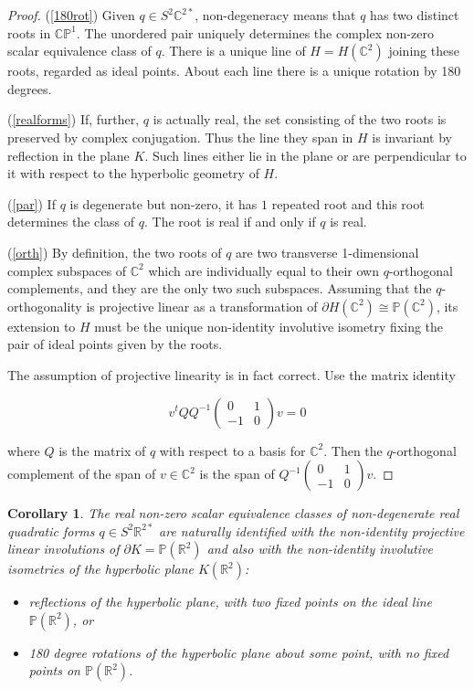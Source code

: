 \documentclass[11pt]{article}
\numberwithin{equation}{section}
\newcounter{count}
\theoremstyle{plain}
\newtheorem{corollary}[count]{Corollary}
\theoremstyle{remark}
\renewcommand{\P}{\mathbb{P}}
\newcommand{\R}{\mathbb{R}}
\newcommand{\C}{\mathbb{C}}
\begin{document}
\begin{proof}

(\ref{180rot}) Given $q\in S^{2}\mathbb{C}^{2*}$, non-degeneracy means that $q$ has two distinct roots in $\mathbb{CP}^{1}$. The unordered pair uniquely determines the complex non-zero scalar equivalence class of $q$. There is a unique line of $H=H(\mathbb{C}^{2})$ joining these roots, regarded as ideal points. About each line there is a unique rotation by 180 degrees.

(\ref{realforms}) If, further, $q$ is actually real, the set consisting of the two roots is preserved by complex conjugation. Thus the line they span in $H$ is invariant by reflection in the plane $K$. Such lines either lie in the plane or are perpendicular to it with respect to the hyperbolic geometry of $H$.

(\ref{par}) If $q$ is degenerate but non-zero, it has $1$ repeated root and this root determines the class of $q$. The root is real if and only if $q$ is real.

(\ref{orth}) By definition, the two roots of $q$ are two transverse 1-dimensional complex subspaces of $\mathbb{C}^{2}$ which are individually equal to their own $q$-orthogonal complements, and they are the only two such subspaces. Assuming that the $q$-orthogonality is projective linear as a transformation of $\partial H(\C^{2})\cong \P(\mathbb{C}^2)$, its extension to $H$ must be the unique non-identity involutive isometry fixing the pair of ideal points given by the roots.

The assumption of projective linearity is in fact correct. Use the matrix identity

\[ v^{t}QQ^{-1}\begin{pmatrix}0&1\\-1&0\end{pmatrix}v=0\]

where $Q$ is the matrix of $q$ with respect to a basis for $\C^{2}$. Then the $q$-orthogonal complement of the span of $v\in \C^{2}$ is the span of $Q^{-1}\begin{pmatrix}0&1\\-1&0\end{pmatrix}v$.

\end{proof}

\begin{corollary}
\label{involutions}
The real non-zero scalar equivalence classes of non-degenerate real quadratic forms $q\in S^{2}\R^{2*}$ are naturally identified with the non-identity projective linear involutions of $\partial K=\mathbb{P}(\mathbb{R}^{2})$ and also with the non-identity involutive isometries of the hyperbolic plane $K(\R^2)$:
\begin{itemize}
\itemsep0em 
\item{reflections of the hyperbolic plane, with two fixed points on the ideal line $\P(\R^{2})$, or}
\item{180 degree rotations of the hyperbolic plane about some point, with no fixed points on $\P(\R^{2})$.}
	\end{itemize}
\end{corollary}
\end{document}
